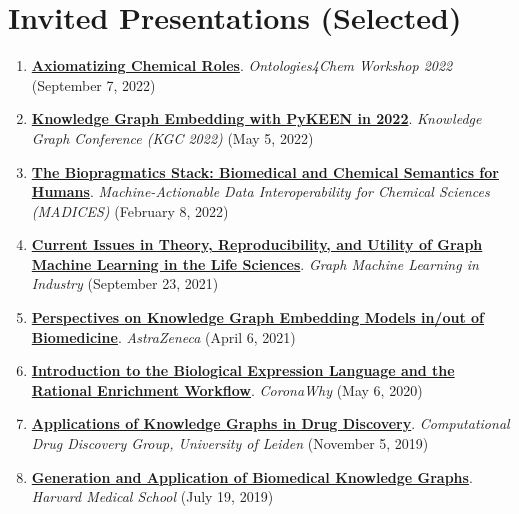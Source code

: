 \documentclass[10pt,a4paper,sans]{moderncv} %
\begin{document}
\section{Invited Presentations (Selected)}
\begin{enumerate}
\itemsep0.5em
    \item \textbf{\href{https://bit.ly/ontologies4chem-crog}{Axiomatizing Chemical Roles}}. \textit{Ontologies4Chem Workshop 2022} (September 7, 2022)

    \item \textbf{\href{https://bit.ly/pykeen-kgc2022}{Knowledge Graph Embedding with PyKEEN in 2022}}. \textit{Knowledge Graph Conference (KGC 2022)} (May 5, 2022)

    \item \textbf{\href{https://docs.google.com/presentation/d/1D0HIX41IgVdTQYKlakWcvlZvOktX23EqbLcs3LmI7mg/edit?usp=sharing}{The Biopragmatics Stack: Biomedical and Chemical Semantics for Humans}}. \textit{Machine-Actionable Data Interoperability for Chemical Sciences (MADICES)} (February 8, 2022)

    \item \textbf{\href{https://www.youtube.com/watch?v=bLN1V5fZD2g&t=3665s}{Current Issues in Theory, Reproducibility, and Utility of Graph Machine Learning in the Life Sciences}}. \textit{Graph Machine Learning in Industry} (September 23, 2021)

    \item \textbf{\href{https://bit.ly/3wvP8yq}{Perspectives on Knowledge Graph Embedding Models in/out of Biomedicine}}. \textit{AstraZeneca} (April 6, 2021)

    \item \textbf{\href{https://youtu.be/rHhuVBpoKdI}{Introduction to the Biological Expression Language and the Rational Enrichment Workflow}}. \textit{CoronaWhy} (May 6, 2020)

    \item \textbf{\href{https://docs.google.com/presentation/d/1NQHQSD2EjOh-9XD6ffr2rDqs8AwOQ3wSBoie-e7-OXU/edit?usp=sharing}{Applications of Knowledge Graphs in Drug Discovery}}. \textit{Computational Drug Discovery Group, University of Leiden} (November 5, 2019)

    \item \textbf{\href{https://docs.google.com/presentation/d/11CG_Q3JrsqqKsDhl8uXP_TZzcyALhcVLvoP_pDmQ5JA/edit?usp=sharing}{Generation and Application of Biomedical Knowledge Graphs}}. \textit{Harvard Medical School} (July 19, 2019)

\end{enumerate}
\end{document}
